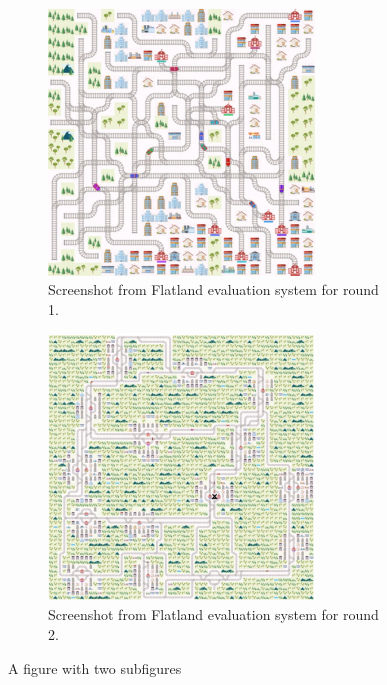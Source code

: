 \begin{figure}[H]
	\centering
	\begin{subfigure}{.5\textwidth}
		\centering
		\includegraphics[width=200pt]{images/example_eval_round1.png}
		\caption{Screenshot from Flatland evaluation system for round 1.}
		\label{fig:sub1}
	\end{subfigure}%
	\begin{subfigure}{.5\textwidth}
		\centering
		\includegraphics[width=200pt]{images/example_eval_round2.png}
		\caption{Screenshot from Flatland evaluation system for round 2.}
		\label{fig:sub2}
	\end{subfigure}
	\caption{A figure with two subfigures}
	\label{fig:test}
\end{figure}

